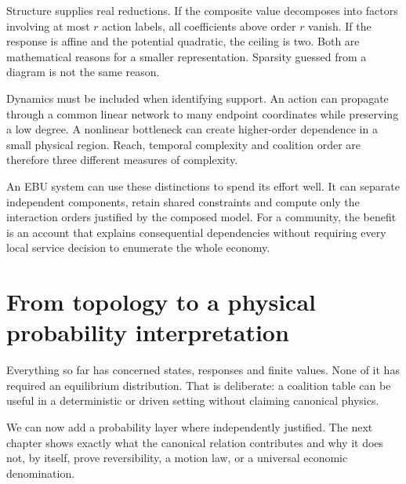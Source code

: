 Structure supplies real reductions. If the composite value decomposes into factors involving at most $r$ action labels, all coefficients above order $r$ vanish. If the response is affine and the potential quadratic, the ceiling is two. Both are mathematical reasons for a smaller representation. Sparsity guessed from a diagram is not the same reason.

Dynamics must be included when identifying support. An action can propagate through a common linear network to many endpoint coordinates while preserving a low degree. A nonlinear bottleneck can create higher-order dependence in a small physical region. Reach, temporal complexity and coalition order are therefore three different measures of complexity.

An EBU system can use these distinctions to spend its effort well. It can separate independent components, retain shared constraints and compute only the interaction orders justified by the composed model. For a community, the benefit is an account that explains consequential dependencies without requiring every local service decision to enumerate the whole economy.

\section{From topology to a physical probability interpretation}
Everything so far has concerned states, responses and finite values. None of it has required an equilibrium distribution. That is deliberate: a coalition table can be useful in a deterministic or driven setting without claiming canonical physics.

We can now add a probability layer where independently justified. The next chapter shows exactly what the canonical relation contributes and why it does not, by itself, prove reversibility, a motion law, or a universal economic denomination.
